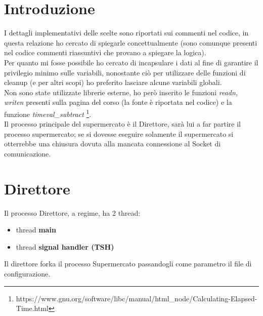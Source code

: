 \documentclass[11pt, a4paper]{article}
\begin{document}
\section{Introduzione}
I dettagli implementativi delle scelte sono riportati sui commenti nel codice, in questa relazione ho cercato di spiegarle concettualmente (sono comunque presenti nel codice commenti riassuntivi che provano a spiegare la logica).\\
Per quanto mi fosse possibile ho cercato di incapsulare i dati al fine di garantire il privilegio minimo sulle variabili, nonostante ciò per utilizzare delle funzioni di cleanup (e per altri scopi) ho preferito lasciare alcune variabili globali.\\
Non sono state utilizzate librerie esterne, ho però inserito le funzioni \textit{readn, writen} presenti sulla pagina del corso (la fonte è riportata nel codice) e la funzione \textit{timeval\_subtract} \footnote{https://www.gnu.org/software/libc/manual/html\_node/Calculating-Elapsed-Time.html}.\\

Il processo principale del supermercato è il Direttore, sarà lui a far partire il processo supermercato; se si dovesse eseguire solamente il supermercato si otterrebbe una chiusura dovuta alla mancata connessione al Socket di comunicazione.
\section{Direttore}
Il processo Direttore, a regime, ha 2 thread:
\begin{itemize}
\item thread \textbf{main} 
\item thread \textbf{signal handler (TSH)}
\end{itemize}
Il direttore forka il processo Supermercato passandogli come parametro il file di configurazione.
\end{document}
